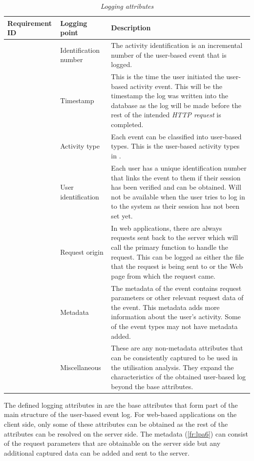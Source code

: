 \begin{table}[!htb]
	\centering
	\caption[Logging attributes]
	{\textit{Logging attributes}}
	\label{tbl:ch2_keyLoggingAttributes}
	\begin{tabularx}{\textwidth}{|l|l|X|}
		\hline \textbf{Requirement ID} & \textbf{Logging point} & \textbf{Description} \\
		\hline \subsubphase{fr:lpa1} & Identification number & The activity identification is an incremental number of the user-based event that is logged.\\
		\hline \subsubphase{fr:lpa2} & Timestamp & This is the time the user initiated the user-based activity event. This will be the timestamp the log was written into the database as the log will be made before the rest of the intended \textit{HTTP request} is completed. \\
		\hline \subsubphase{fr:lpa3} & Activity type & Each event can be classified into user-based types. This is the user-based activity types in \Cref{tbl:ch2_userActivityTypes}.\\
		\hline \subsubphase{fr:lpa4} & User identification & Each user has a unique identification number that links the event to them if their session has been verified and can be obtained. Will not be available when the user tries to log in to the system as their session has not been set yet. \\
		\hline \subsubphase{fr:lpa5} & Request origin & In web applications, there are always requests sent back to the server which will call the primary function to handle the request. This can be logged as either the file that the request is being sent to or the Web page from which the request came. \\
		\hline \subsubphase{fr:lpa6} & Metadata & The metadata of the event contains request parameters or other relevant request data of the event. This metadata adds more information about the user's activity. Some of the event types may not have metadata added. \\
		\hline \subsubphase{fr:lpa7} & Miscellaneous & These are any non-metadata attributes that can be consistently captured to be used in the utilisation analysis. They expand the characteristics of the obtained user-based log beyond the base attributes. \\ \hline
	\end{tabularx}
\end{table}

The defined logging attributes in  are the base attributes that form part of the main structure of the user-based event log. For web-based applications on the client side, only some of these attributes can be obtained as the rest of the attributes can be resolved on the server side. The metadata (\ref{fr:lpa6}) can consist of the request parameters that are obtainable on the server side but any additional captured data can be added and sent to the server.

